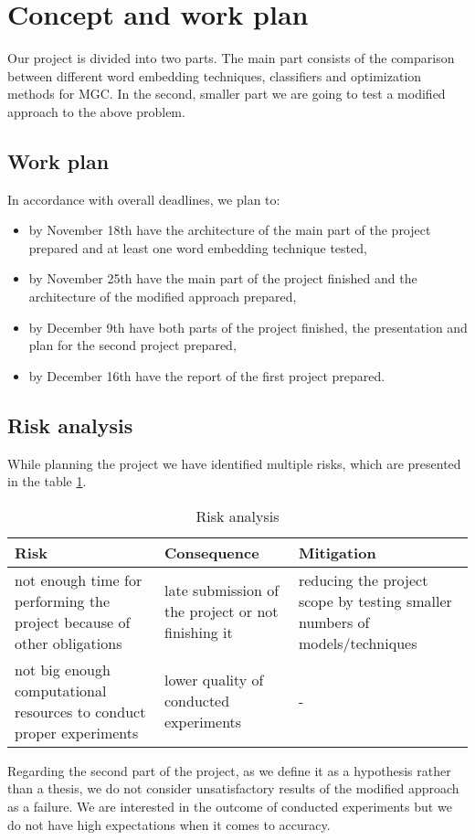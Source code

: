 \section{Concept and work plan}

Our project is divided into two parts. The main part consists of the comparison between different word embedding techniques, classifiers and optimization methods for MGC. In the second, smaller part we are going to test a modified approach to the above problem.

\subsection{Work plan}

In accordance with overall deadlines, we plan to:
\begin{itemize}
    \item by November 18th have the architecture of the main part of the project prepared and at least one word embedding technique tested,
    \item by November 25th have the main part of the project finished and the architecture of the modified approach prepared,
    \item by December 9th have both parts of the project finished, the presentation and plan for the second project prepared,
    \item by December 16th have the report of the first project prepared.
\end{itemize}

\subsection{Risk analysis}

While planning the project we have identified multiple risks, which are presented in the table \ref{tab:risk}. 

\begin{table}[ht]
    \centering
    \begin{tabularx}{0.5\textwidth}{X|X|X}
        \textbf{Risk} & \textbf{Consequence} & \textbf{Mitigation} \\\hline
        not enough time for performing the project because of other obligations & late submission of the project or not finishing it & reducing the project scope by testing smaller numbers of models/techniques \\\hline
        not big enough computational resources to conduct proper experiments & lower quality of conducted experiments & - \\
    \end{tabularx}
    \caption{Risk analysis}
    \label{tab:risk}
\end{table}

Regarding the second part of the project, as we define it as a hypothesis rather than a thesis, we do not consider unsatisfactory results of the modified approach as a failure. We are interested in the outcome of conducted experiments but we do not have high expectations when it comes to accuracy.

